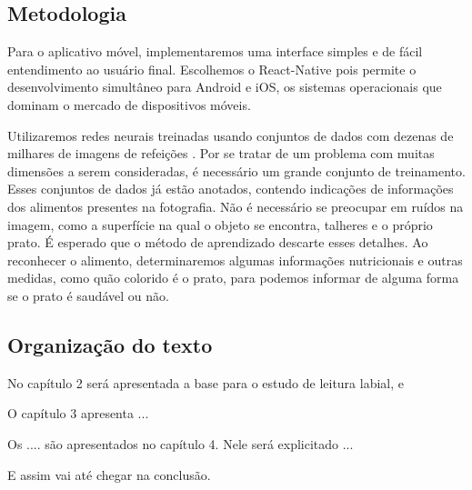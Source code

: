 \subsection{Metodologia}

Para o aplicativo móvel, implementaremos uma interface simples e de fácil entendimento ao usuário final. Escolhemos o React-Native \cite{react-native_2015} pois permite o desenvolvimento simultâneo para Android e iOS, os sistemas operacionais que dominam o mercado de dispositivos móveis. 

Utilizaremos redes neurais treinadas usando conjuntos de dados com dezenas de milhares de imagens de refeições \cite{kawano2014food}. Por se tratar de um problema com muitas dimensões a serem consideradas, é necessário um grande conjunto de treinamento. Esses conjuntos de dados já estão anotados, contendo indicações de informações dos alimentos presentes na fotografia. Não é necessário se preocupar em ruídos na imagem, como a superfície na qual o objeto se encontra, talheres e o próprio prato. É esperado que o método de aprendizado descarte esses detalhes.
Ao reconhecer o alimento, determinaremos algumas informações nutricionais e outras medidas, como quão colorido é o prato, para podemos informar de alguma forma se o prato é saudável ou não.

\subsection{Organização do texto}

No capítulo 2 será apresentada a base para o estudo de leitura labial, e 

O capítulo 3 apresenta ...

Os .... são apresentados no capítulo 4. Nele será explicitado ...

E assim vai até chegar na conclusão.
